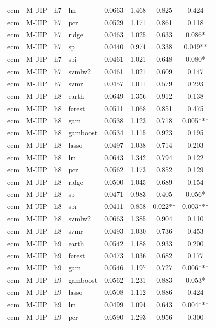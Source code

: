 \begin{ThreePartTable}
\begin{longtable}[t]{llclcccc}
ecm & M-UIP & h7 & lm & 0.0663 & 1.468 & 0.825 & 0.424\\
ecm & M-UIP & h7 & pcr & 0.0529 & 1.171 & 0.861 & 0.118\\
ecm & M-UIP & h7 & ridge & 0.0463 & 1.025 & 0.633 & 0.086*\\
ecm & M-UIP & h7 & sp & 0.0440 & 0.974 & 0.338 & 0.049**\\
ecm & M-UIP & h7 & spi & 0.0461 & 1.021 & 0.648 & 0.080*\\
ecm & M-UIP & h7 & svmlw2 & 0.0461 & 1.021 & 0.609 & 0.147\\
ecm & M-UIP & h7 & svmr & 0.0457 & 1.011 & 0.579 & 0.293\\
\addlinespace
ecm & M-UIP & h8 & earth & 0.0649 & 1.356 & 0.912 & 0.138\\
ecm & M-UIP & h8 & forest & 0.0511 & 1.068 & 0.851 & 0.475\\
ecm & M-UIP & h8 & gam & 0.0538 & 1.123 & 0.718 & 0.005***\\
ecm & M-UIP & h8 & gamboost & 0.0534 & 1.115 & 0.923 & 0.195\\
ecm & M-UIP & h8 & lasso & 0.0497 & 1.038 & 0.714 & 0.203\\
ecm & M-UIP & h8 & lm & 0.0643 & 1.342 & 0.794 & 0.122\\
ecm & M-UIP & h8 & pcr & 0.0562 & 1.173 & 0.852 & 0.129\\
ecm & M-UIP & h8 & ridge & 0.0500 & 1.045 & 0.689 & 0.154\\
ecm & M-UIP & h8 & sp & 0.0471 & 0.983 & 0.405 & 0.056*\\
ecm & M-UIP & h8 & spi & 0.0411 & 0.858 & 0.022** & 0.003***\\
ecm & M-UIP & h8 & svmlw2 & 0.0663 & 1.385 & 0.904 & 0.110\\
ecm & M-UIP & h8 & svmr & 0.0493 & 1.030 & 0.736 & 0.453\\
\addlinespace
ecm & M-UIP & h9 & earth & 0.0542 & 1.188 & 0.933 & 0.200\\
ecm & M-UIP & h9 & forest & 0.0473 & 1.036 & 0.682 & 0.177\\
ecm & M-UIP & h9 & gam & 0.0546 & 1.197 & 0.727 & 0.006***\\
ecm & M-UIP & h9 & gamboost & 0.0562 & 1.231 & 0.883 & 0.053*\\
ecm & M-UIP & h9 & lasso & 0.0508 & 1.112 & 0.886 & 0.424\\
ecm & M-UIP & h9 & lm & 0.0499 & 1.094 & 0.643 & 0.004***\\
ecm & M-UIP & h9 & pcr & 0.0590 & 1.293 & 0.956 & 0.300\\

\end{longtable}
\end{ThreePartTable}
